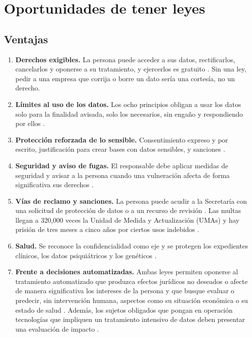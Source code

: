 \documentclass[11pt,letterpaper]{article}
\begin{document}
\section{Oportunidades de tener leyes}

\subsection{Ventajas}

\begin{enumerate}
    \item \textbf{Derechos exigibles.} La persona puede acceder a sus datos, rectificarlos, cancelarlos y oponerse a su tratamiento, y ejercerlos es gratuito \parencite[arts.~37 a 41 y 44]{lgpdppso2025}\parencite[arts.~21 a 26]{lfpdppp2025}. Sin una ley, pedir a una empresa que corrija o borre un dato sería una cortesía, no un derecho.
    \item \textbf{Límites al uso de los datos.} Los ocho principios obligan a usar los datos solo para la finalidad avisada, solo los necesarios, sin engaño y respondiendo por ellos \parencite{iae_u6_t61}\parencite[art.~10]{lgpdppso2025}.
    \item \textbf{Protección reforzada de lo sensible.} Consentimiento expreso y por escrito, justificación para crear bases con datos sensibles, y sanciones \parencite[arts.~8, 59 y 64]{lfpdppp2025}.
    \item \textbf{Seguridad y aviso de fugas.} El responsable debe aplicar medidas de seguridad y avisar a la persona cuando una vulneración afecta de forma significativa sus derechos \parencite[arts.~18 y 19]{lfpdppp2025}\parencite[art.~34]{lgpdppso2025}.
    \item \textbf{Vías de reclamo y sanciones.} La persona puede acudir a la Secretaría con una solicitud de protección de datos \parencite[art.~40]{lfpdppp2025} o a un recurso de revisión \parencite[art.~86]{lgpdppso2025}. Las multas llegan a 320,000 veces la Unidad de Medida y Actualización (UMAs) y hay prisión de tres meses a cinco años por ciertos usos indebidos \parencite[arts.~59, 62 y 63]{lfpdppp2025}.
    \item \textbf{Salud.} Se reconoce la confidencialidad como eje y se protegen los expedientes clínicos, los datos psiquiátricos y los genéticos \parencite{conbioetica2014,iae_u6_t61}.
    \item \textbf{Frente a decisiones automatizadas.} Ambas leyes permiten oponerse al tratamiento automatizado que produzca efectos jurídicos no deseados o afecte de manera significativa los intereses de la persona y que busque evaluar o predecir, sin intervención humana, aspectos como su situación económica o su estado de salud \parencite[art.~41]{lgpdppso2025}\parencite[art.~26]{lfpdppp2025}. Además, los sujetos obligados que pongan en operación tecnologías que impliquen un tratamiento intensivo de datos deben presentar una evaluación de impacto \parencite[arts.~3, fr.~XV, y 71]{lgpdppso2025}.
\end{enumerate}
\end{document}
